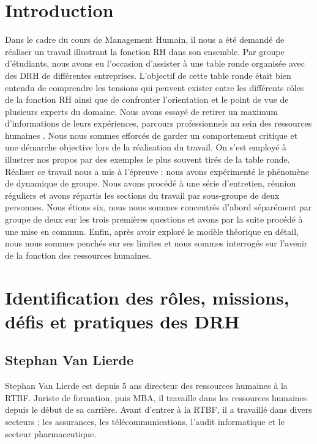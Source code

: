 \documentclass[a4paper, 12pt]{article}
\begin{document}
\newpage
\tableofcontents
\linespread{1}
\newpage

\section{Introduction}

Dans le cadre du cours de Management Humain, il nous a été demandé de réaliser un travail illustrant la fonction RH dans son ensemble. Par groupe d'étudiants, nous avons eu l'occasion d'assister à une table ronde organisée avec des DRH de différentes entreprises. L'objectif de cette table ronde était bien entendu de comprendre les tensions qui peuvent exister entre les différents rôles de la fonction RH ainsi que de confronter l'orientation et le point de vue de plusieurs experts du domaine. Nous avons essayé de retirer un maximum d'informations de leurs expériences, parcours professionnels au sein des ressources humaines . Nous nous sommes efforcés de garder un comportement critique et une démarche objective lors de la réalisation du travail. On s'est employé à illustrer nos propos par des exemples le plus souvent tirés de la table ronde. Réaliser ce travail nous a mis à l'épreuve : nous avons expérimenté le phénomène de dynamique de groupe. Nous avons procédé à une série d'entretien, réunion réguliers et avons répartis les sections du travail par sous-groupe de deux personnes. Nous étions six, nous nous sommes concentrés d'abord séparément par groupe de deux sur les trois premières questions et avons par la suite procédé à une mise en commun. Enfin, après avoir exploré le modèle théorique en détail, nous nous sommes penchés sur ses limites et nous sommes interrogés sur l'avenir de la fonction des ressources humaines.

\section{Identification des rôles, missions, défis et pratiques des DRH}

\subsection{Stephan Van Lierde}

Stephan Van Lierde est depuis 5 ans directeur des ressources humaines à la RTBF. Juriste de formation, puis MBA, il travaille dans les ressources humaines depuis le début de sa carrière. Avant d'entrer à la RTBF, il a travaillé dans divers secteurs ; les assurances, les télécommunications, l'audit informatique et le secteur pharmaceutique.
\end{document}
